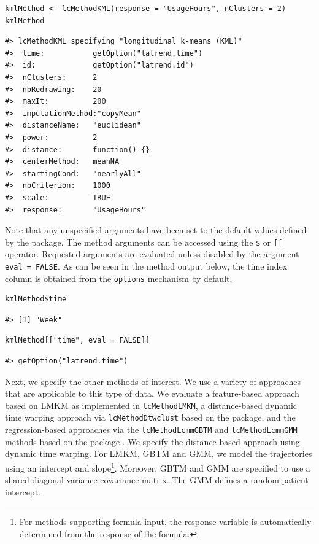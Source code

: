 \begin{verbatim}
kmlMethod <- lcMethodKML(response = "UsageHours", nClusters = 2)
kmlMethod
\end{verbatim}

\begin{verbatim}
#> lcMethodKML specifying "longitudinal k-means (KML)"
#>  time:           getOption("latrend.time")
#>  id:             getOption("latrend.id")
#>  nClusters:      2
#>  nbRedrawing:    20
#>  maxIt:          200
#>  imputationMethod:"copyMean"
#>  distanceName:   "euclidean"
#>  power:          2
#>  distance:       function() {}
#>  centerMethod:   meanNA
#>  startingCond:   "nearlyAll"
#>  nbCriterion:    1000
#>  scale:          TRUE
#>  response:       "UsageHours"
\end{verbatim}

Note that any unspecified arguments have been set to the default values defined by the  package. The method arguments can be accessed using the \texttt{\$} or \texttt{{[}{[}} operator. Requested arguments are evaluated unless disabled by the argument \texttt{eval\ =\ FALSE}. As can be seen in the method output below, the time index column is obtained from the \texttt{options} mechanism by default.

\begin{verbatim}
kmlMethod$time
\end{verbatim}

\begin{verbatim}
#> [1] "Week"
\end{verbatim}

\begin{verbatim}
kmlMethod[["time", eval = FALSE]]
\end{verbatim}

\begin{verbatim}
#> getOption("latrend.time")
\end{verbatim}

Next, we specify the other methods of interest. We use a variety of approaches that are applicable to this type of data. We evaluate a feature-based approach based on LMKM as implemented in \texttt{lcMethodLMKM}, a distance-based dynamic time warping approach via \texttt{lcMethodDtwclust} based on the  package, and the regression-based approaches via the \texttt{lcMethodLcmmGBTM} and \texttt{lcMethodLcmmGMM} methods based on the  package \citep{proustlima2017estimation}. We specify the distance-based approach using dynamic time warping. For LMKM, GBTM and GMM, we model the trajectories using an intercept and slope\footnote{For methods supporting formula input, the response variable is automatically determined from the response of the formula.}. Moreover, GBTM and GMM are specified to use a shared diagonal variance-covariance matrix. The GMM defines a random patient intercept.

